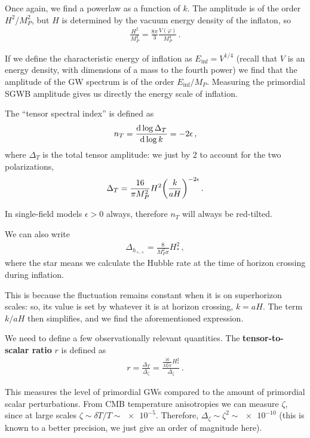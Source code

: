 \documentclass[main.tex]{subfiles}
\begin{document}
Once again, we find a powerlaw as a function of \(k\). 
The amplitude is of the order \(H^2 / M_P^2\), but \(H\) is determined by the vacuum energy density of the inflaton, so 
%
\begin{align}
\frac{H^2}{M_P^2} = \frac{8 \pi }{3} \frac{V(\varphi )}{M_P^4}
\,.
\end{align}

If we define the characteristic energy of inflation as \(E_{\text{inf}} = V^{1/4}\) (recall that \(V\) is an energy density, with dimensions of a mass to the fourth power) we find that the amplitude of the GW spectrum is of the order \(E _{\text{inf}} / M_P\). 
Measuring the primordial SGWB amplitude gives us directly the energy scale of inflation. 

The ``tensor spectral index'' is defined as 
%
\begin{align}
n_T = \dv{\log \Delta _T}{\log k} = - 2 \epsilon 
\,,
\end{align}
%
where \(\Delta _T\) is the total tensor amplitude: we just by 2 to account for the two polarizations,
%
\begin{align}
\Delta_T = \frac{16}{\pi M_P^2} H^2 \qty(\frac{k}{aH})^{-2\epsilon }
\,.
\end{align}

In single-field models \(\epsilon > 0\) always, therefore \(n_T \) will always be red-tilted. 

We can also write 
%
\begin{align}
\Delta_{h_{+, \times }} = \frac{8}{M_P^2 \pi } H^2_*
\,,
\end{align}
%
where the star means we calculate the Hubble rate at the time of horizon crossing during inflation. 

This is because the fluctuation remains constant when it is on superhorizon scales: so, its value is set by whatever it is at horizon crossing, \(k = aH\).
The term \(k / aH\) then simplifies, and we find the aforementioned expression.

We need to define a few observationally relevant quantities. 
The \textbf{tensor-to-scalar ratio} \(r\) is defined as 
%
\begin{align}
r = \frac{\Delta _T}{\Delta _\zeta }
= \frac{ \frac{16}{M_P^2 \pi } H^2_*}{\Delta _\zeta }
\,.
\end{align}

This measures the level of primordial GWs compared to the amount of primordial scalar perturbations. 
From CMB temperature anisotropies we can measure \(\zeta \), since at large scales \(\zeta \sim \delta T / T \sim \num{e-5}\). Therefore, \(\Delta_\zeta \sim \zeta^2 \sim \num{e-10}\) (this is known to a better precision, we just give an order of magnitude here).
\end{document}
